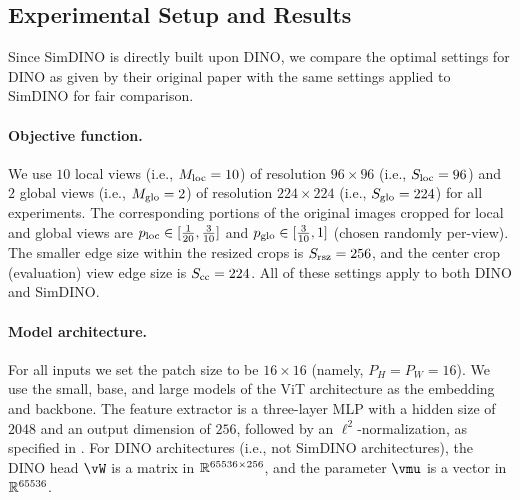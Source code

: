 \documentclass[\toplevelprefix/book-main.tex]{subfiles}
\begin{document}
\subsection{Experimental Setup and Results} \label{sub:contrastive_learning_experiment_results}

Since SimDINO is directly built upon DINO, we compare the optimal settings for DINO as given by their original paper \citep{caron2021emerging} with the same settings applied to SimDINO for fair comparison. 

\paragraph{Objective function.} We use \(10\) local views (i.e., \(M_{\mathrm{loc}} = 10\)) of resolution \(96 \times 96\) (i.e., \(S_{\mathrm{loc}} = 96\)) and \(2\) global views (i.e., \(M_{\mathrm{glo}} = 2\)) of resolution \(224 \times 224\) (i.e., \(S_{\mathrm{glo}} = 224\)) for all experiments. The corresponding portions of the original images cropped for local and global views are \(p_{\mathrm{loc}} \in [\frac{1}{20}, \frac{3}{10}]\) and \(p_{\mathrm{glo}} \in [\frac{3}{10}, 1]\) (chosen randomly per-view). The smaller edge size within the resized crops is \(S_{\mathrm{rsz}} = 256\), and the center crop (evaluation) view edge size is \(S_{\mathrm{cc}} = 224\). All of these settings apply to both DINO and SimDINO.

\paragraph{Model architecture.} For all inputs we set the patch size to be \(16 \times 16\) (namely, \(P_{H} = P_{W} = 16\)). We use the small, base, and large models of the ViT \citep{dosovitskiy2020image} architecture as the embedding and backbone. The feature extractor is a three-layer MLP with a hidden size of \(2048\) and an output dimension of \(256\), followed by an \(\ell^{2}\)-normalization, as specified in . For DINO architectures (i.e., not SimDINO architectures), the DINO head \(\vW\) is a matrix in \(\mathbb{R}^{65536 \times 256}\), and the parameter \(\vmu\) is a vector in \(\mathbb{R}^{65536}\). 
\end{document}
